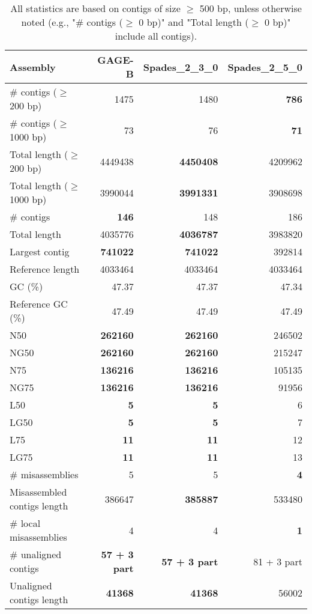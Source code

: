\documentclass[12pt,a4paper]{article}
\begin{document}
\begin{table}[ht]
\begin{center}
\caption{All statistics are based on contigs of size $\geq$ 500 bp, unless otherwise noted (e.g., "\# contigs ($\geq$ 0 bp)" and "Total length ($\geq$ 0 bp)" include all contigs).}
\begin{tabular}{|l*{3}{|r}|}
\hline
Assembly & GAGE-B & Spades\_2\_3\_0 & Spades\_2\_5\_0 \\ \hline
\# contigs ($\geq$ 200 bp) & 1475 & 1480 & {\bf 786} \\ \hline
\# contigs ($\geq$ 1000 bp) & 73 & 76 & {\bf 71} \\ \hline
Total length ($\geq$ 200 bp) & 4449438 & {\bf 4450408} & 4209962 \\ \hline
Total length ($\geq$ 1000 bp) & 3990044 & {\bf 3991331} & 3908698 \\ \hline
\# contigs & {\bf 146} & 148 & 186 \\ \hline
Total length & 4035776 & {\bf 4036787} & 3983820 \\ \hline
Largest contig & {\bf 741022} & {\bf 741022} & 392814 \\ \hline
Reference length & 4033464 & 4033464 & 4033464 \\ \hline
GC (\%) & 47.37 & 47.37 & 47.34 \\ \hline
Reference GC (\%) & 47.49 & 47.49 & 47.49 \\ \hline
N50 & {\bf 262160} & {\bf 262160} & 246502 \\ \hline
NG50 & {\bf 262160} & {\bf 262160} & 215247 \\ \hline
N75 & {\bf 136216} & {\bf 136216} & 105135 \\ \hline
NG75 & {\bf 136216} & {\bf 136216} & 91956 \\ \hline
L50 & {\bf 5} & {\bf 5} & 6 \\ \hline
LG50 & {\bf 5} & {\bf 5} & 7 \\ \hline
L75 & {\bf 11} & {\bf 11} & 12 \\ \hline
LG75 & {\bf 11} & {\bf 11} & 13 \\ \hline
\# misassemblies & 5 & 5 & {\bf 4} \\ \hline
Misassembled contigs length & 386647 & {\bf 385887} & 533480 \\ \hline
\# local misassemblies & 4 & 4 & {\bf 1} \\ \hline
\# unaligned contigs & {\bf 57 + 3 part} & {\bf 57 + 3 part} & 81 + 3 part \\ \hline
Unaligned contigs length & {\bf 41368} & {\bf 41368} & 56002 \\ \hline

\end{tabular}
\end{center}
\end{table}
\end{document}
